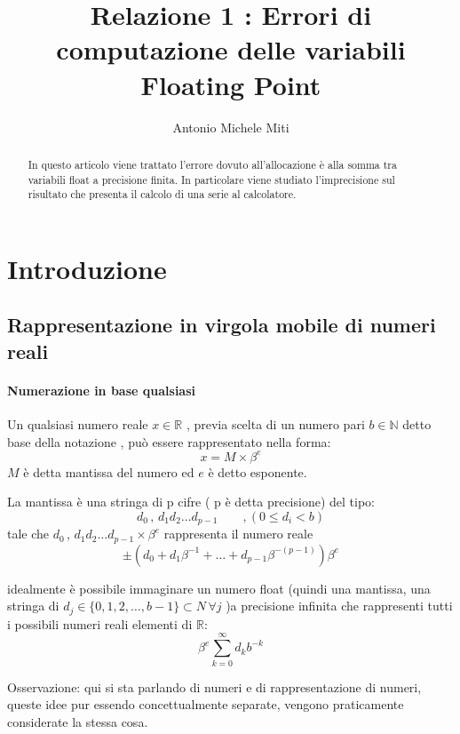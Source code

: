 \documentclass{article}
\title{Relazione 1 : Errori di computazione delle variabili Floating Point}
\author{Antonio Michele Miti}
\begin{document}
\maketitle
\begin{abstract}
In questo articolo viene trattato l'errore dovuto all'allocazione è alla somma tra variabili float a precisione finita.
In particolare viene studiato l'imprecisione sul risultato che presenta il calcolo di una serie al calcolatore.
\end{abstract}


\section{Introduzione}
\subsection{Rappresentazione in virgola mobile di numeri reali}
\paragraph{Numerazione in base qualsiasi}

Un qualsiasi numero reale $x\in \mathbb{R}$ , previa scelta di un numero pari $b \in \mathbb{N}$ detto base della notazione , può essere rappresentato nella forma:
	\begin{equation}
	x= M \times \beta^{e}
	\end{equation}
$M$ è detta mantissa del numero ed $e$ è detto esponente.

La mantissa è una stringa di p cifre ( p è detta precisione) del tipo:
$$ d_{0} \, , \, d_{1} d_{2} \ldots d_{p-1} \qquad , (0 \leq d_{i} < b)$$
tale che $d_{0} \, , \, d_{1} d_{2} \ldots d_{p-1} \times \beta^{e}$ rappresenta il numero reale
	\begin{equation}
	\pm(d_{0} + d_{1}\beta ^{-1} + \ldots + d_{p-1}\beta ^{-(p-1)})\beta^{e} 
	\end{equation}

idealmente è possibile immaginare un numero float (quindi una mantissa, una stringa di $d_{j} \in \lbrace 0,1,2,\ldots,b-1 \rbrace \subset N \, \forall j $ )a precisione infinita che rappresenti tutti i possibili numeri reali elementi di $\mathbb{R}$:
	\begin{equation}
	\beta^{e}\sum_{k=0}^{\infty}d_{k}b^{-k}
	\end{equation}

Osservazione: qui si sta parlando di numeri e di rappresentazione di numeri, queste idee pur essendo concettualmente separate, vengono praticamente considerate la stessa cosa.
\end{document}
